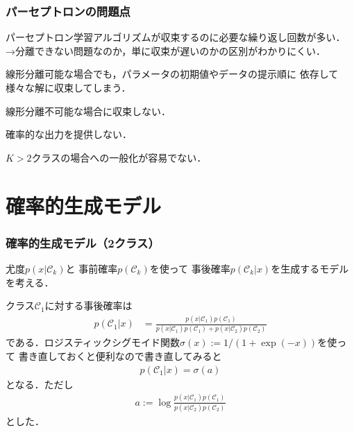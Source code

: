 \documentclass[10pt,%
hyperref={unicode}]{beamer}
\newenvironment{wideenumerate}{\enumerate\addtolength{\itemsep}{1em}}{\endenumerate}
\begin{document}
\begin{frame}
    \frametitle{パーセプトロンの問題点}

    \begin{wideenumerate}
        \item パーセプトロン学習アルゴリズムが収束するのに必要な繰り返し回数が多い．
            →分離できない問題なのか，単に収束が遅いのかの区別がわかりにくい．

        \item 線形分離可能な場合でも，パラメータの初期値やデータの提示順に
            依存して様々な解に収束してしまう．

        \item 線形分離不可能な場合に収束しない．

        \item 確率的な出力を提供しない．

        \item $K>2$クラスの場合への一般化が容易でない．

    \end{wideenumerate}

\end{frame}

\section{確率的生成モデル}

\begin{frame}
    \frametitle{確率的生成モデル（2クラス）}
    尤度$p(x|\mathcal{C}_k)$と
    事前確率$p(\mathcal{C}_k)$を使って
    事後確率$p(\mathcal{C}_k|x)$を生成するモデルを考える．

    \bigskip

    クラス$\mathcal{C}_1$に対する事後確率は
    \begin{align*}
        p(\mathcal{C}_1|x)
        &= \frac{p(x|\mathcal{C}_1)p(\mathcal{C}_1)}%
        {p(x|\mathcal{C}_1)p(\mathcal{C}_1) + p(x|\mathcal{C}_2)p(\mathcal{C}_2)}
    \end{align*}
    である．ロジスティックシグモイド関数$\sigma(x) := 1/(1 + \exp(-x))$を使って
    書き直しておくと便利なので書き直してみると
    \begin{align}
        p(\mathcal{C}_1|x) = \sigma(a) \tag{4.57}
    \end{align}
    となる．ただし
    \begin{align}
        a := \log \frac{p(x|\mathcal{C}_1)p(\mathcal{C}_1)}%
        {p(x|\mathcal{C}_2)p(\mathcal{C}_2)} \tag{4.58} \label{logistica}
    \end{align}
    とした．
\end{frame}
\end{document}
